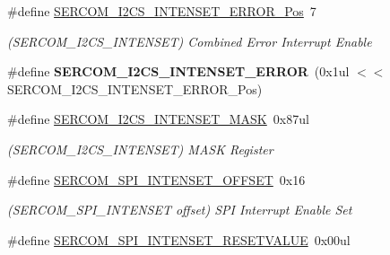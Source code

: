 \begin{DoxyCompactItemize}
\item 
\hypertarget{group___s_a_m_l21___s_e_r_c_o_m_ga36518baa6b0c898cc4125c4abef85a9c}{}\#define \hyperlink{group___s_a_m_l21___s_e_r_c_o_m_ga36518baa6b0c898cc4125c4abef85a9c}{S\+E\+R\+C\+O\+M\+\_\+\+I2\+C\+S\+\_\+\+I\+N\+T\+E\+N\+S\+E\+T\+\_\+\+E\+R\+R\+O\+R\+\_\+\+Pos}~7\label{group___s_a_m_l21___s_e_r_c_o_m_ga36518baa6b0c898cc4125c4abef85a9c}

\begin{DoxyCompactList}\small\item\em (S\+E\+R\+C\+O\+M\+\_\+\+I2\+C\+S\+\_\+\+I\+N\+T\+E\+N\+S\+E\+T) Combined Error Interrupt Enable \end{DoxyCompactList}\item 
\hypertarget{group___s_a_m_l21___s_e_r_c_o_m_ga5d46d9248afc0fea3e165477ac17864b}{}\#define {\bfseries S\+E\+R\+C\+O\+M\+\_\+\+I2\+C\+S\+\_\+\+I\+N\+T\+E\+N\+S\+E\+T\+\_\+\+E\+R\+R\+O\+R}~(0x1ul $<$$<$ S\+E\+R\+C\+O\+M\+\_\+\+I2\+C\+S\+\_\+\+I\+N\+T\+E\+N\+S\+E\+T\+\_\+\+E\+R\+R\+O\+R\+\_\+\+Pos)\label{group___s_a_m_l21___s_e_r_c_o_m_ga5d46d9248afc0fea3e165477ac17864b}

\item 
\hypertarget{group___s_a_m_l21___s_e_r_c_o_m_gafcaf78f9921872d44f741ad59765fd2b}{}\#define \hyperlink{group___s_a_m_l21___s_e_r_c_o_m_gafcaf78f9921872d44f741ad59765fd2b}{S\+E\+R\+C\+O\+M\+\_\+\+I2\+C\+S\+\_\+\+I\+N\+T\+E\+N\+S\+E\+T\+\_\+\+M\+A\+S\+K}~0x87ul\label{group___s_a_m_l21___s_e_r_c_o_m_gafcaf78f9921872d44f741ad59765fd2b}

\begin{DoxyCompactList}\small\item\em (S\+E\+R\+C\+O\+M\+\_\+\+I2\+C\+S\+\_\+\+I\+N\+T\+E\+N\+S\+E\+T) M\+A\+S\+K Register \end{DoxyCompactList}\item 
\hypertarget{group___s_a_m_l21___s_e_r_c_o_m_gafff10b38901ffe23764fafd643a10192}{}\#define \hyperlink{group___s_a_m_l21___s_e_r_c_o_m_gafff10b38901ffe23764fafd643a10192}{S\+E\+R\+C\+O\+M\+\_\+\+S\+P\+I\+\_\+\+I\+N\+T\+E\+N\+S\+E\+T\+\_\+\+O\+F\+F\+S\+E\+T}~0x16\label{group___s_a_m_l21___s_e_r_c_o_m_gafff10b38901ffe23764fafd643a10192}

\begin{DoxyCompactList}\small\item\em (S\+E\+R\+C\+O\+M\+\_\+\+S\+P\+I\+\_\+\+I\+N\+T\+E\+N\+S\+E\+T offset) S\+P\+I Interrupt Enable Set \end{DoxyCompactList}\item 
\hypertarget{group___s_a_m_l21___s_e_r_c_o_m_gaead88d8c6da327ba0d9ea274f4fcc71a}{}\#define \hyperlink{group___s_a_m_l21___s_e_r_c_o_m_gaead88d8c6da327ba0d9ea274f4fcc71a}{S\+E\+R\+C\+O\+M\+\_\+\+S\+P\+I\+\_\+\+I\+N\+T\+E\+N\+S\+E\+T\+\_\+\+R\+E\+S\+E\+T\+V\+A\+L\+U\+E}~0x00ul\label{group___s_a_m_l21___s_e_r_c_o_m_gaead88d8c6da327ba0d9ea274f4fcc71a}


\end{DoxyCompactItemize}
